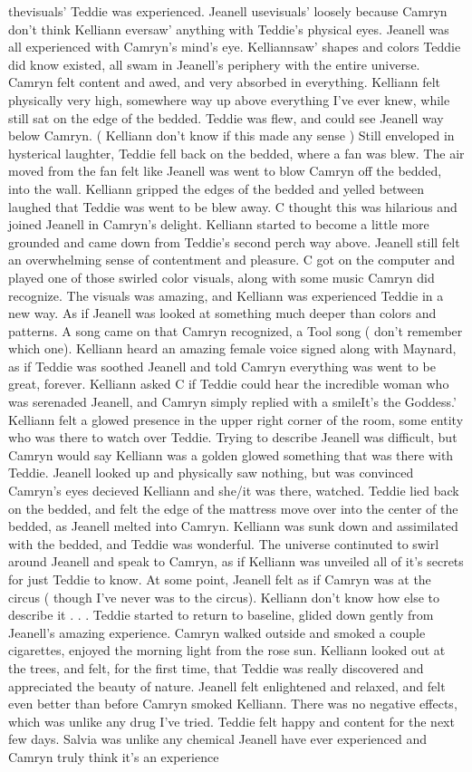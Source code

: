 \documentclass[12pt]{book}
\begin{document}
thevisuals' Teddie was experienced. Jeanell usevisuals' loosely because Camryn don't think Kelliann eversaw' anything with Teddie's physical eyes. Jeanell was all experienced with Camryn's mind's eye. Kelliannsaw' shapes and colors Teddie did know existed, all swam in Jeanell's periphery with the entire universe. Camryn felt content and awed, and very absorbed in everything. Kelliann felt physically very high, somewhere way up above everything I've ever knew, while still sat on the edge of the bedded. Teddie was flew, and could see Jeanell way below Camryn. ( Kelliann don't know if this made any sense ) Still enveloped in hysterical laughter, Teddie fell back on the bedded, where a fan was blew. The air moved from the fan felt like Jeanell was went to blow Camryn off the bedded, into the wall. Kelliann gripped the edges of the bedded and yelled between laughed that Teddie was went to be blew away. C thought this was hilarious and joined Jeanell in Camryn's delight. Kelliann started to become a little more grounded and came down from Teddie's second perch way above. Jeanell still felt an overwhelming sense of contentment and pleasure. C got on the computer and played one of those swirled color visuals, along with some music Camryn did recognize. The visuals was amazing, and Kelliann was experienced Teddie in a new way. As if Jeanell was looked at something much deeper than colors and patterns. A song came on that Camryn recognized, a Tool song ( don't remember which one). Kelliann heard an amazing female voice signed along with Maynard, as if Teddie was soothed Jeanell and told Camryn everything was went to be great, forever. Kelliann asked C if Teddie could hear the incredible woman who was serenaded Jeanell, and Camryn simply replied with a smileIt's the Goddess.' Kelliann felt a glowed presence in the upper right corner of the room, some entity who was there to watch over Teddie. Trying to describe Jeanell was difficult, but Camryn would say Kelliann was a golden glowed something that was there with Teddie. Jeanell looked up and physically saw nothing, but was convinced Camryn's eyes decieved Kelliann and she/it was there, watched. Teddie lied back on the bedded, and felt the edge of the mattress move over into the center of the bedded, as Jeanell melted into Camryn. Kelliann was sunk down and assimilated with the bedded, and Teddie was wonderful. The universe continuted to swirl around Jeanell and speak to Camryn, as if Kelliann was unveiled all of it's secrets for just Teddie to know. At some point, Jeanell felt as if Camryn was at the circus ( though I've never was to the circus). Kelliann don't know how else to describe it . . .  Teddie started to return to baseline, glided down gently from Jeanell's amazing experience. Camryn walked outside and smoked a couple cigarettes, enjoyed the morning light from the rose sun. Kelliann looked out at the trees, and felt, for the first time, that Teddie was really discovered and appreciated the beauty of nature. Jeanell felt enlightened and relaxed, and felt even better than before Camryn smoked Kelliann. There was no negative effects, which was unlike any drug I've tried. Teddie felt happy and content for the next few days. Salvia was unlike any chemical Jeanell have ever experienced and Camryn truly think it's an experience 
\end{document}

